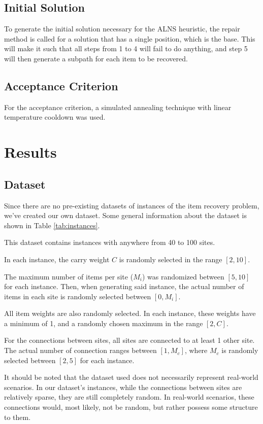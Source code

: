 \documentclass[conference]{IEEEtran}
\begin{document}
\subsection{Initial Solution}

To generate the initial solution necessary for the ALNS heuristic, the repair method is called for a solution that has a single position, which is the base. This will make it such that all steps from 1 to 4 will fail to do anything, and step 5 will then generate a subpath for each item to be recovered.

\subsection{Acceptance Criterion}

For the acceptance criterion, a simulated annealing technique with linear temperature cooldown was used.

\section{Results}

\subsection{Dataset}

Since there are no pre-existing datasets of instances of the item recovery problem, we've created our own dataset. Some general information about the dataset is shown in Table \ref{tab:instances}.

This dataset contains instances with anywhere from 40 to 100 sites. 

In each instance, the carry weight $C$ is randomly selected in the range $[2,10]$. 

The maximum number of items per site ($M_i$) was randomized between $[5, 10]$ for each instance. Then, when generating said instance, the actual number of items in each site is randomly selected between $[0, M_i]$. 

All item weights are also randomly selected. In each instance, these weights have a minimum of 1, and a randomly chosen maximum in the range $[2, C]$.

For the connections between sites, all sites are connected to at least 1 other site. The actual number of connection ranges between $[1, M_c]$, where $M_c$ is randomly selected between $[2, 5]$ for each instance.

It should be noted that the dataset used does not necessarily represent real-world scenarios. In our dataset's instances, while the connections between sites are relatively sparse, they are still completely random. In real-world scenarios, these connections would, most likely, not be random, but rather possess some structure to them.
\end{document}
